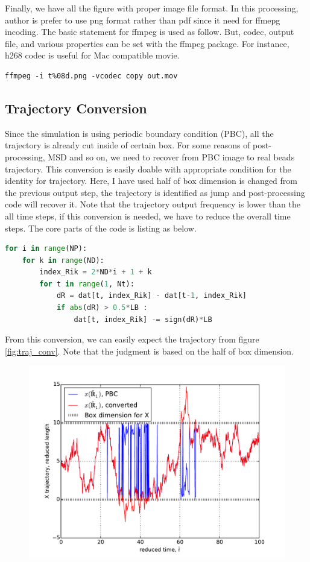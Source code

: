 \documentclass[10pt, a4paper]{article}
\begin{document}
\begin{appendices}
Finally, we have all the figure with proper image file format. In this processing, author is prefer to use png format rather than pdf since it need for ffmepg incoding. The basic statement for ffmpeg is used as follow. But, codec, output file, and various properties can be set with the ffmpeg package. For instance, h268 codec is useful for Mac compatible movie.
\begin{lstlisting}[frame=single,numbers=none]
ffmpeg -i t%08d.png -vcodec copy out.mov
\end{lstlisting}

\subsection{Trajectory Conversion}
Since the simulation is using periodic boundary condition (PBC), all the trajectory is already cut inside of certain box. For some reasons of post-processing, MSD and so on, we need to recover from PBC image to real beads trajectory. This conversion is easily doable with appropriate condition for the identity for trajectory. Here, I have used half of box dimension is changed from the previous output step, the trajectory is identified as jump and post-processing code will recover it. Note that the trajectory output frequency is lower than the all time steps, if this conversion is needed, we have to reduce the overall time steps. The core parts of the code is listing as below.
\begin{lstlisting}[language=Python, frame=single]
for i in range(NP):
    for k in range(ND):
        index_Rik = 2*ND*i + 1 + k
        for t in range(1, Nt):
            dR = dat[t, index_Rik] - dat[t-1, index_Rik]
            if abs(dR) > 0.5*LB :
                dat[t, index_Rik] -= sign(dR)*LB
\end{lstlisting}
From this conversion, we can easily expect the trajectory from figure \ref{fig:traj_conv}. Note that the judgment is based on the half of box dimension. 
\begin{figure}
\centering
\includegraphics[width=\textwidth]{figures/converting_trajectory.pdf}

\end{figure}
\end{appendices}
\end{document}

